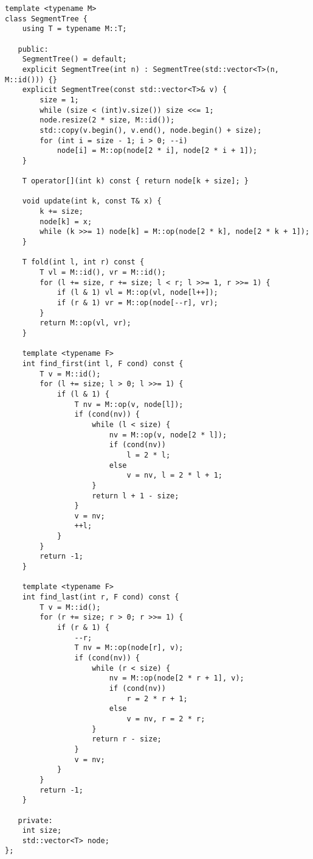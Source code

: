 \begin{lstlisting}
template <typename M>
class SegmentTree {
    using T = typename M::T;

   public:
    SegmentTree() = default;
    explicit SegmentTree(int n) : SegmentTree(std::vector<T>(n, M::id())) {}
    explicit SegmentTree(const std::vector<T>& v) {
        size = 1;
        while (size < (int)v.size()) size <<= 1;
        node.resize(2 * size, M::id());
        std::copy(v.begin(), v.end(), node.begin() + size);
        for (int i = size - 1; i > 0; --i)
            node[i] = M::op(node[2 * i], node[2 * i + 1]);
    }

    T operator[](int k) const { return node[k + size]; }

    void update(int k, const T& x) {
        k += size;
        node[k] = x;
        while (k >>= 1) node[k] = M::op(node[2 * k], node[2 * k + 1]);
    }

    T fold(int l, int r) const {
        T vl = M::id(), vr = M::id();
        for (l += size, r += size; l < r; l >>= 1, r >>= 1) {
            if (l & 1) vl = M::op(vl, node[l++]);
            if (r & 1) vr = M::op(node[--r], vr);
        }
        return M::op(vl, vr);
    }

    template <typename F>
    int find_first(int l, F cond) const {
        T v = M::id();
        for (l += size; l > 0; l >>= 1) {
            if (l & 1) {
                T nv = M::op(v, node[l]);
                if (cond(nv)) {
                    while (l < size) {
                        nv = M::op(v, node[2 * l]);
                        if (cond(nv))
                            l = 2 * l;
                        else
                            v = nv, l = 2 * l + 1;
                    }
                    return l + 1 - size;
                }
                v = nv;
                ++l;
            }
        }
        return -1;
    }

    template <typename F>
    int find_last(int r, F cond) const {
        T v = M::id();
        for (r += size; r > 0; r >>= 1) {
            if (r & 1) {
                --r;
                T nv = M::op(node[r], v);
                if (cond(nv)) {
                    while (r < size) {
                        nv = M::op(node[2 * r + 1], v);
                        if (cond(nv))
                            r = 2 * r + 1;
                        else
                            v = nv, r = 2 * r;
                    }
                    return r - size;
                }
                v = nv;
            }
        }
        return -1;
    }

   private:
    int size;
    std::vector<T> node;
};
\end{lstlisting}

